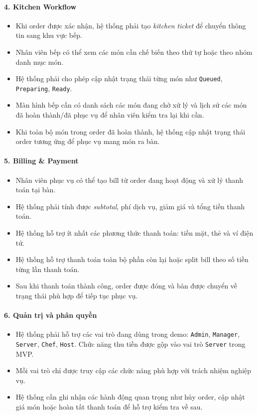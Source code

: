 \documentclass[12pt,a4paper]{article}
\begin{document}
\paragraph{4. Kitchen Workflow}
\begin{itemize}
    \item Khi order được xác nhận, hệ thống phải tạo \textit{kitchen ticket} để chuyển thông tin sang khu vực bếp.
    \item Nhân viên bếp có thể xem các món cần chế biến theo thứ tự hoặc theo nhóm danh mục món.
    \item Hệ thống phải cho phép cập nhật trạng thái từng món như \texttt{Queued}, \texttt{Preparing}, \texttt{Ready}.
    \item Màn hình bếp cần có danh sách các món đang chờ xử lý và lịch sử các món đã hoàn thành/đã phục vụ để nhân viên kiểm tra lại khi cần.
    \item Khi toàn bộ món trong order đã hoàn thành, hệ thống cập nhật trạng thái order tương ứng để phục vụ mang món ra bàn.
\end{itemize}

\paragraph{5. Billing \& Payment}
\begin{itemize}
    \item Nhân viên phục vụ có thể tạo bill từ order đang hoạt động và xử lý thanh toán tại bàn.
    \item Hệ thống phải tính được \textit{subtotal}, phí dịch vụ, giảm giá và tổng tiền thanh toán.
    \item Hệ thống hỗ trợ ít nhất các phương thức thanh toán: tiền mặt, thẻ và ví điện tử.
    \item Hệ thống hỗ trợ thanh toán toàn bộ phần còn lại hoặc split bill theo số tiền từng lần thanh toán.
    \item Sau khi thanh toán thành công, order được đóng và bàn được chuyển về trạng thái phù hợp để tiếp tục phục vụ.
\end{itemize}

\paragraph{6. Quản trị và phân quyền}
\begin{itemize}
    \item Hệ thống phải hỗ trợ các vai trò đang dùng trong demo: \texttt{Admin}, \texttt{Manager}, \texttt{Server}, \texttt{Chef}, \texttt{Host}. Chức năng thu tiền được gộp vào vai trò \texttt{Server} trong MVP.
    \item Mỗi vai trò chỉ được truy cập các chức năng phù hợp với trách nhiệm nghiệp vụ.
    \item Hệ thống cần ghi nhận các hành động quan trọng như hủy order, cập nhật giá món hoặc hoàn tất thanh toán để hỗ trợ kiểm tra về sau.
\end{itemize}
\end{document}
